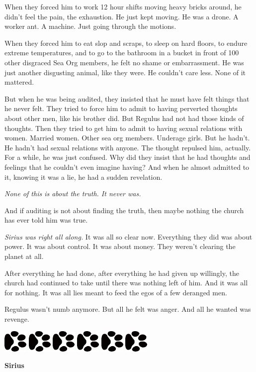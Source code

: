 \documentclass[12pt,twoside,openright]{memoir}
\newcommand{\dogPrintRule}{	
	\begin{center}
		\hspace{.5em}
		\includegraphics[angle=60]{dogprint.pdf}
		\hspace{.5em}
		\includegraphics[angle=120]{dogprint.pdf}
		\hspace{.5em}
		\includegraphics[angle=60]{dogprint.pdf}
		\hspace{.5em}
		\includegraphics[angle=120]{dogprint.pdf}
		\hspace{.5em}
		\includegraphics[angle=60]{dogprint.pdf}
		\hspace{.5em}
		\includegraphics[angle=120]{dogprint.pdf}
		\hspace{.5em}
	\end{center}
}
\begin{document}
When they forced him to work 12 hour shifts moving heavy bricks around, he didn't feel the pain, the exhaustion. He just kept moving. He was a drone. A worker ant. A machine. Just going through the motions.

When they forced him to eat slop and scraps, to sleep on hard floors, to endure extreme temperatures, and to go to the bathroom in a bucket in front of 100 other disgraced Sea Org members, he felt no shame or embarrassment. He was just another disgusting animal, like they were. He couldn't care less. None of it mattered.

But when he was being audited, they insisted that he must have felt things that he never felt. They tried to force him to admit to having perverted thoughts about other men, like his brother did. But Regulus had not had those kinds of thoughts. Then they tried to get him to admit to having sexual relations with women. Married women. Other sea org members. Underage girls. But he hadn't. He hadn't had sexual relations with anyone. The thought repulsed him, actually. For a while, he was just confused. Why did they insist that he had thoughts and feelings that he couldn't even imagine having? And when he almost admitted to it, knowing it was a lie, he had a sudden revelation. 

\textit{None of this is about the truth. It never was.} 

And if auditing is not about finding the truth, then maybe nothing the church has ever told him was true. 

\textit{Sirius was right all along.} It was all so clear now. Everything they did was about power. It was about control. It was about money. They weren't clearing the planet at all. 

After everything he had done, after everything he had given up willingly, the church had continued to take until there was nothing left of him. And it was all for nothing. It was all lies meant to feed the egos of a few deranged men. 

Regulus wasn't numb anymore. But all he felt was anger. And all he wanted was revenge.

\dogPrintRule

\textbf{Sirius} 
\end{document}

